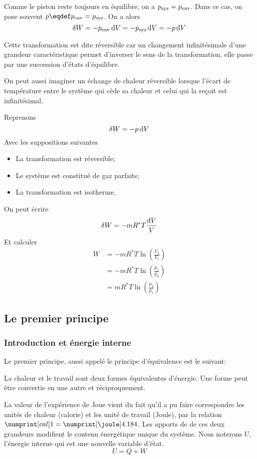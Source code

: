 Comme le piston reste toujours en équilibre, on a $p_{\mathrm{sys}} = p_{\mathrm{env}}$.
Dans ce cas, on pose souvent $p \eqdef \penv = \psys$.
On a alors
\[ \delta W = -p_{\mathrm{env}} \operatorname{d}\! V = -p_{\mathrm{sys}} \operatorname{d}\! V = -p \operatorname{d}\! V \]

Cette transformation est dite réversible car un changement infinitésimale
d'une grandeur caractéristique permet d'inverser le sens de la transformation,
elle passe par une succession d'états d'équilibre.

On peut aussi imaginer un échange de chaleur réversible lorsque
l'écart de température entre le système qui cède sa chaleur et
celui qui la reçoit est infinitésimal.

Reprenons
\[ \delta W = -p\operatorname{d}\! V \]
Avec les suppositions suivantes
\begin{itemize}
  \item La transformation est réversible;
  \item Le système est constitué de gaz parfaits;
  \item La transformation est isotherme.
\end{itemize}
On peut écrire
\[ \delta W = -mR^*T\frac{\operatorname{d}\! V}V \]
Et calculer
\begin{align*}
  W & = -mR^*T \ln\left(\frac{V_2}{V_1}\right)\\
    & = -mR^*T \ln\left(\frac{p_1}{p_2}\right)\\
    & = mR^*T \ln\left(\frac{p_2}{p_1}\right)
\end{align*}

\subsection{Le premier principe}
\subsubsection{Introduction et énergie interne}
Le premier principe, aussi appelé le principe d'équivalence est le suivant:

La chaleur et le travail sont deux formes équivalentes d'énergie.
Une forme peut être convertie en une autre et réciproquement.

La valeur de l'expérience de Joue vient du fait qu'il a pu
faire correspondre les unités de chaleur (calorie) et
les unité de travail (Joule), par la relation
$\si{1}{cal} = \si{4.184}{\joule}$.
Les apports de de ces deux grandeurs modifient
le contenu énergétique unique du système.
Nous noterons $U$, l'énergie interne qui est une nouvelle variable d'état.
\[ U = Q + W \]

